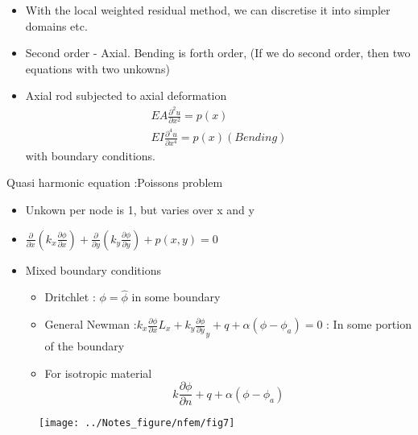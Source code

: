 	\begin{frame}
		\begin{itemize}
			\item With the local weighted residual method, we can discretise it into simpler domains etc.
			\item Second order - Axial. Bending is forth order, (If we do second order, then two equations with two unkowns)
			\item Axial rod subjected to axial deformation
			\begin{equation}
			\begin{aligned}
			EA \frac{\partial^2 u}{\partial x^2} = p(x)\\
			EI \frac{\partial^4 u}{\partial x^4} = p(x)  (Bending)			
			\end{aligned}
			\end{equation}		
			with boundary conditions. 
		\end{itemize}
	\end{frame}


	\begin{frame}{Quasi harmonic equation :Poissons problem}
		\begin{itemize}
			\item Unkown per node is 1, but varies over x and y
			\item $\frac{\partial }{\partial x} \left(k_x\frac{\partial \phi}{\partial x} \right) + \frac{\partial }{\partial y} \left(k_y\frac{\partial \phi}{\partial y} \right) + p(x,y) = 0$ 
			\item Mixed boundary conditions 
			\begin{itemize}
				\item Dritchlet : $\phi = \hat{\phi}$ in some boundary
				\item General Newman :$k_x\frac{\partial \phi}{\partial x} L_x  + k_y\frac{\partial \phi}{\partial y} _y + q + \alpha(\phi - \phi_a) = 0$ : In some portion of the boundary 		
				\item For isotropic material 
				\begin{equation}
				k \frac{\partial \phi}{\partial n} + q + \alpha(\phi - \phi_a)
				\end{equation}		
			\end{itemize}
		\end{itemize}
	\end{frame}


	\begin{frame}
		\begin{figure}
			\centering
			\texttt{[image: ../Notes\_figure/nfem/fig7]}
		\end{figure}
	\end{frame}


